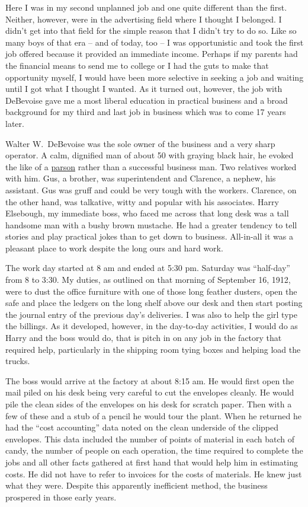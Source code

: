 \documentclass[12pt]{book}              %
\begin{document}
Here I was in my second unplanned job and one quite different than the first. Neither, however, were in the advertising field where I thought I belonged. I didn't get into that field for the simple reason that I didn't try to do so. Like so many boys of that era -- and of today, too -- I was opportunistic and took the first job offered because it provided an immediate income. Perhaps if my parents had the financial means to send me to college or I had the guts to make that opportunity myself, I would have been more selective in seeking a job and waiting until I got what I thought I wanted. As it turned out, however, the job with DeBevoise gave me a most liberal education in practical business and a broad background for my third and last job in business which was to come 17 years later.

Walter W.~DeBevoise was the sole owner of the business and a very sharp operator. A calm, dignified man of about 50 with graying black hair, he evoked the like of a \href{http://en.wikipedia.org/wiki/Parson}{parson} rather than a successful business man. Two relatives worked with him. Gus, a brother, was superintendent and Clarence, a nephew, his assistant. Gus was gruff and could be very tough with the workers. Clarence, on the other hand, was talkative, witty and popular with his associates. Harry Elsebough, my immediate boss, who faced me across that long desk was a tall handsome man with a bushy brown mustache. He had a greater tendency to tell stories and play practical jokes than to get down to business. All-in-all it was a pleasant place to work despite the long ours and hard work.

The work day started at 8 am and ended at 5:30 pm. Saturday was ``half-day'' from 8 to 3:30. My duties, as outlined on that morning of September 16, 1912, were to dust the office furniture with one of those long feather dusters, open the safe and place the ledgers on the long shelf above our desk and then start posting the journal entry of the previous day's deliveries. I was also to help the girl type the billings. As it developed, however, in the day-to-day activities, I would do as Harry and the boss would do, that is pitch in on any job in the factory that required help, particularly in the shipping room tying boxes and helping load the trucks. 

The boss would arrive at the factory at about 8:15 am. He would first open the mail piled on his desk being very careful to cut the envelopes cleanly. He would pile the clean sides of the envelopes on his desk for scratch paper. Then with a few of these and a stub of a pencil he would tour the plant. When he returned he had the ``cost accounting'' data noted on the clean underside of the clipped envelopes. This data included the number of points of material in each batch of candy, the number of people on each operation, the time required to complete the jobs and all other facts gathered at first hand that would help him in estimating costs. He did not have to refer to invoices for the costs of materials. He knew just what they were. Despite this apparently inefficient method, the business prospered in those early years.
\end{document}
